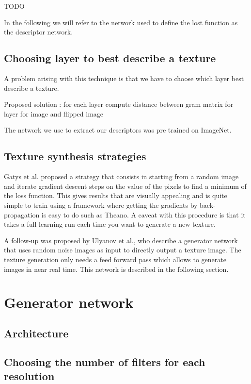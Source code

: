 \documentclass{article}
\begin{document}
TODO

In the following we will refer to the network used to define the lost function as the descriptor network.

\subsection{Choosing layer to best describe a texture}

A problem arising with this technique is that we have to choose which layer best describe a texture.

Proposed solution : for each layer compute distance between gram matrix for layer for image and flipped image

The network we use to extract our descriptors was pre trained on ImageNet. 

\subsection{Texture synthesis strategies}

Gatys et al. proposed a strategy that consists in starting from a random image and iterate gradient descent steps on the value of the pixels to find a minimum of the loss function. This gives results that are visually appealing and is quite simple to train using a framework where getting the gradients by back-propagation is easy to do such as Theano. A caveat with this procedure is that it takes a full learning run each time you want to generate a new texture.

A follow-up was proposed by Ulyanov et al., who describe a generator network that uses random noise images as input to directly output a texture image. The texture generation only needs a feed forward pass which allows to generate images in near real time. This network is described in the following section.



\section{Generator network}

\subsection{Architecture}

\subsection{Choosing the number of filters for each resolution}
\end{document}

